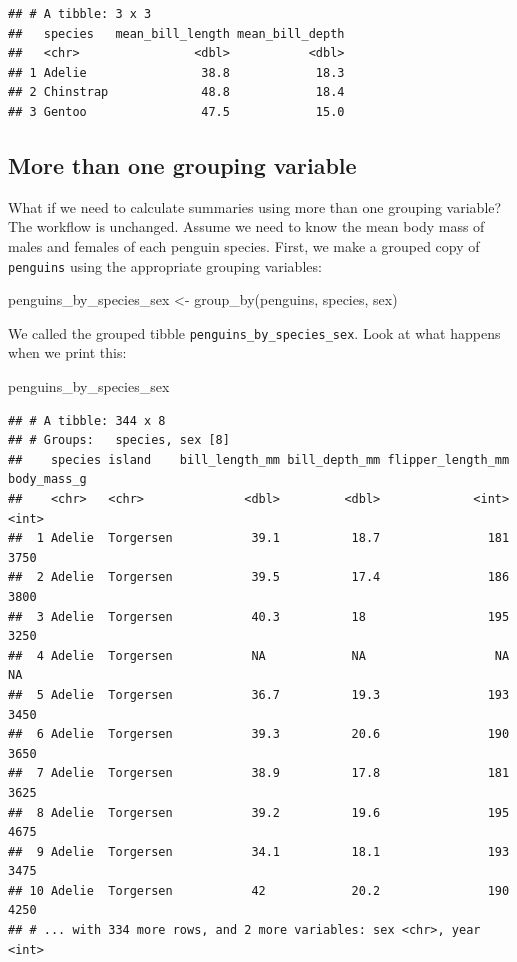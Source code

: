 \documentclass[
]{book}
\newenvironment{Shaded}{\begin{snugshade}}{\end{snugshade}}
\newcommand{\FunctionTok}[1]{\textcolor[rgb]{0.00,0.00,0.00}{#1}}
\newcommand{\NormalTok}[1]{#1}
\newcommand{\OtherTok}[1]{\textcolor[rgb]{0.56,0.35,0.01}{#1}}
\begin{document}
\begin{verbatim}
## # A tibble: 3 x 3
##   species   mean_bill_length mean_bill_depth
##   <chr>                <dbl>           <dbl>
## 1 Adelie                38.8            18.3
## 2 Chinstrap             48.8            18.4
## 3 Gentoo                47.5            15.0
\end{verbatim}

\hypertarget{more-than-one-grouping-variable}{%
\subsection{More than one grouping variable}\label{more-than-one-grouping-variable}}

What if we need to calculate summaries using more than one grouping variable? The workflow is unchanged. Assume we need to know the mean body mass of males and females of each penguin species. First, we make a grouped copy of \texttt{penguins} using the appropriate grouping variables:

\begin{Shaded}
\begin{Highlighting}[]
\NormalTok{penguins\_by\_species\_sex }\OtherTok{\textless{}{-}} \FunctionTok{group\_by}\NormalTok{(penguins, species, sex)}
\end{Highlighting}
\end{Shaded}

We called the grouped tibble \texttt{penguins\_by\_species\_sex}. Look at what happens when we print this:

\begin{Shaded}
\begin{Highlighting}[]
\NormalTok{penguins\_by\_species\_sex}
\end{Highlighting}
\end{Shaded}

\begin{verbatim}
## # A tibble: 344 x 8
## # Groups:   species, sex [8]
##    species island    bill_length_mm bill_depth_mm flipper_length_mm body_mass_g
##    <chr>   <chr>              <dbl>         <dbl>             <int>       <int>
##  1 Adelie  Torgersen           39.1          18.7               181        3750
##  2 Adelie  Torgersen           39.5          17.4               186        3800
##  3 Adelie  Torgersen           40.3          18                 195        3250
##  4 Adelie  Torgersen           NA            NA                  NA          NA
##  5 Adelie  Torgersen           36.7          19.3               193        3450
##  6 Adelie  Torgersen           39.3          20.6               190        3650
##  7 Adelie  Torgersen           38.9          17.8               181        3625
##  8 Adelie  Torgersen           39.2          19.6               195        4675
##  9 Adelie  Torgersen           34.1          18.1               193        3475
## 10 Adelie  Torgersen           42            20.2               190        4250
## # ... with 334 more rows, and 2 more variables: sex <chr>, year <int>
\end{verbatim}
\end{document}
